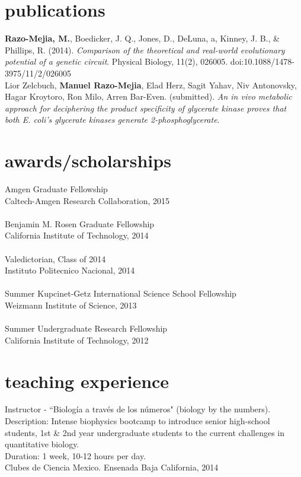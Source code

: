 \documentclass[]{friggeri-cv}
\begin{document}
\section{publications}
\textbf{Razo-Mejia, M.}, Boedicker, J. Q., Jones, D., DeLuna, a, Kinney, J. B., & Phillips, R. (2014). \textit{Comparison of the theoretical and real-world evolutionary potential of a genetic circuit}. Physical Biology, 11(2), 026005. doi:10.1088/1478-3975/11/2/026005\\

Lior Zelcbuch, \textbf{Manuel Razo-Mejia}, Elad Herz, Sagit Yahav, Niv Antonovsky, Hagar Kroytoro, Ron Milo, Arren Bar-Even. (submitted). \textit{An in vivo metabolic approach for deciphering the product specificity of glycerate kinase proves that both E. coli's glycerate kinases generate 2-phosphoglycerate}.


\section{awards/scholarships}
Amgen Graduate Fellowship\\
{Caltech-Amgen Research Collaboration, 2015}\\
\\
Benjamin M. Rosen Graduate Fellowship\\
{California Institute of Technology, 2014}\\
\\
Valedictorian, Class of 2014\\
{Instituto Politecnico Nacional, 2014}\\
\\
Summer Kupcinet-Getz International Science School Fellowship\\
{Weizmann Institute of Science, 2013}\\
\\
Summer Undergraduate Research Fellowship\\
{California Institute of Technology, 2012}\\

\section{teaching experience}
Instructor - ``Biolog\'{i}a a trav\'{e}s de los n\'{u}meros" (biology by the numbers).\\
Description: Intense biophysics bootcamp to introduce senior high-school students, 1st \& 2nd year undergraduate students to the current challenges in quantitative biology.\\
Duration: 1 week, 10-12 hours per day.\\
{Clubes de Ciencia Mexico. Ensenada Baja California, 2014}\\
\end{document}
